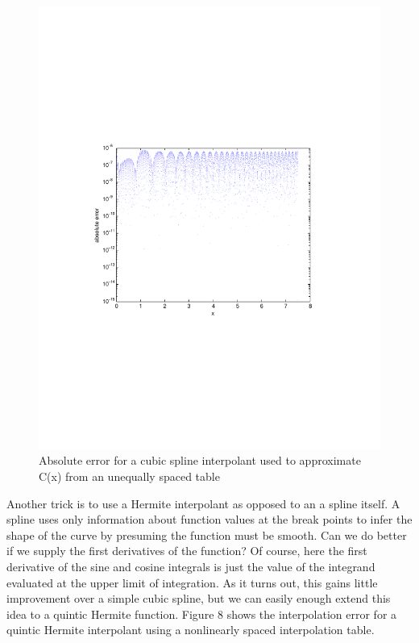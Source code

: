 \documentclass[a4paper,11pt]{article}
\begin{document}
\begin{figure}
\centering
    \includegraphics[width=5in]{unequallyspacedspline.pdf}
        \caption{Absolute error for a cubic spline interpolant used to approximate C(x) from an unequally spaced table}
\end{figure}

Another trick is to use a Hermite interpolant as opposed to an a spline itself. A spline uses only information about function values at the break points to infer the shape of the curve by presuming the function must be smooth. Can we do better if we supply the first derivatives of the function? Of course, here the first derivative of the sine and cosine integrals is just the value of the integrand evaluated at the upper limit of integration. As it turns out, this gains little improvement over a simple cubic spline, but we can easily enough extend this idea to a quintic Hermite function. Figure 8 shows the interpolation error for a quintic Hermite interpolant using a nonlinearly spaced interpolation table.
\end{document}
